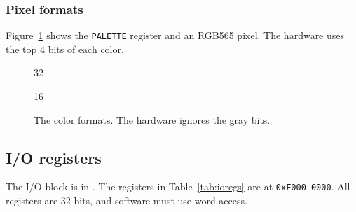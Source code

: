 \subsubsection{Pixel formats}
Figure~\ref{fig:palreg} shows the \texttt{PALETTE} register and an RGB565 pixel. The hardware uses the top 4 bits of each color.

\begin{figure}[H]
  \centering
  \begin{bitfield}[scale=0.88]{32}
  \end{bitfield}

  \medskip
  \begin{bitfield}[scale=0.88]{16}
  \end{bitfield}
  \caption{The color formats. The hardware ignores the gray bits.}
  \label{fig:palreg}
\end{figure}

\subsection{I/O registers}

The I/O block is in . The registers in Table~\ref{tab:ioregs} are at \texttt{0xF000\_0000}. All registers are 32 bits, and software must use word access.

